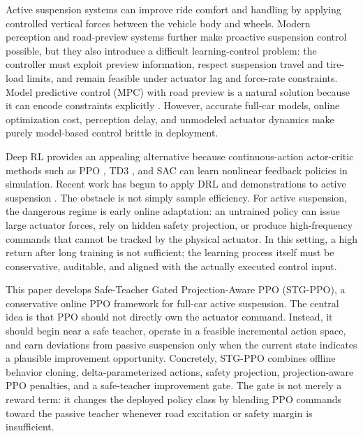 \documentclass[letterpaper,twocolumn]{article}
\begin{document}
Active suspension systems can improve ride comfort and handling by applying controlled vertical forces between the vehicle body and wheels.
Modern perception and road-preview systems further make proactive suspension control possible, but they also introduce a difficult learning-control problem: the controller must exploit preview information, respect suspension travel and tire-load limits, and remain feasible under actuator lag and force-rate constraints.
Model predictive control (MPC) with road preview is a natural solution because it can encode constraints explicitly \citep{papadimitrakis2022preview_mpc,li2024speed_preview_mpc}.
However, accurate full-car models, online optimization cost, perception delay, and unmodeled actuator dynamics make purely model-based control brittle in deployment.

Deep RL provides an appealing alternative because continuous-action actor-critic methods such as PPO \citep{schulman2017ppo}, TD3 \citep{fujimoto2018td3}, and SAC \citep{haarnoja2018sac} can learn nonlinear feedback policies in simulation.
Recent work has begun to apply DRL and demonstrations to active suspension \citep{tan2024active_demo}.
The obstacle is not simply sample efficiency.
For active suspension, the dangerous regime is early online adaptation: an untrained policy can issue large actuator forces, rely on hidden safety projection, or produce high-frequency commands that cannot be tracked by the physical actuator.
In this setting, a high return after long training is not sufficient; the learning process itself must be conservative, auditable, and aligned with the actually executed control input.

This paper develops Safe-Teacher Gated Projection-Aware PPO (STG-PPO), a conservative online PPO framework for full-car active suspension.
The central idea is that PPO should not directly own the actuator command.
Instead, it should begin near a safe teacher, operate in a feasible incremental action space, and earn deviations from passive suspension only when the current state indicates a plausible improvement opportunity.
Concretely, STG-PPO combines offline behavior cloning, delta-parameterized actions, safety projection, projection-aware PPO penalties, and a safe-teacher improvement gate.
The gate is not merely a reward term: it changes the deployed policy class by blending PPO commands toward the passive teacher whenever road excitation or safety margin is insufficient.
\end{document}
